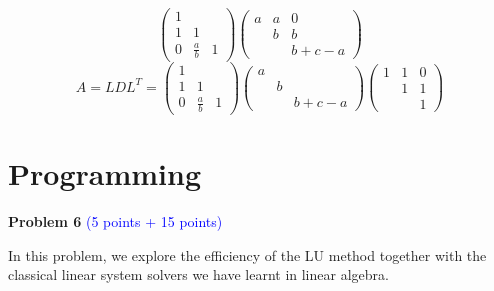 \documentclass[english,onecolumn]{IEEEtran}
\begin{document}
\begin{enumerate}
\begin{itemize}
$$\begin{pmatrix}
    	1 &  &  \\ 
    	1& 1 &  \\ 
    	0&  \frac{a}{b}& 1\end{pmatrix}\begin{pmatrix}
    	a & a & 0 \\ 
    	& b &  b\\ 
    	& & b+c-a\end{pmatrix}$$
    	$$A=LDL^T=\begin{pmatrix}
    	1 &  &  \\ 
    	1& 1 &  \\ 
    	0&  \frac{a}{b}& 1\end{pmatrix}\begin{pmatrix}
    	a &  &  \\ 
    	& b &  \\ 
    	& & b+c-a\end{pmatrix}\begin{pmatrix}
    	1 & 1 & 0 \\ 
    	& 1 & 1\\ 
    	& & 1\end{pmatrix}$$
    \end{itemize}    
\end{enumerate}

\newpage
\section{Programming}
\noindent\textbf{Problem 6}
\textcolor{blue}{(5 points + 15 points)}

\noindent In this problem, we explore  the efficiency of the LU method together with the classical linear system solvers we have learnt in linear algebra. 
\end{document}
